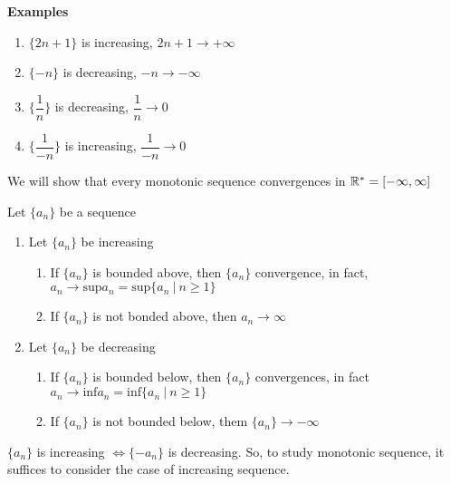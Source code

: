 \textbf{Examples}

\begin{enumerate}[wide,label = $\bullet$]
	\item $\{2n + 1\}$ is increasing, $2n+1 \rightarrow + \infty$
	\item $\{-n\}$ is decreasing, $-n \rightarrow - \infty$
	\item $\{\dfrac{1}{n}\}$ is decreasing, $\dfrac{1}{n} \rightarrow 0$
	\item $\{\dfrac{1}{-n}\}$ is increasing, $\dfrac{1}{-n} \rightarrow 0$
\end{enumerate}

We will show that every monotonic sequence convergences in $\mathbb{R}^* = [-\infty,\infty]$


\begin{thm}
	Let $\{a_n\}$ be a sequence	
	\begin{enumerate}[wide,label = ($\alph*$)]
			\item Let $\{a_n\}$ be increasing
			\begin{enumerate}[label = ($\roman*$)]
				\item If $\{a_n\}$ is bounded above, then $\{a_n\}$ convergence, in fact, $a_n \rightarrow \text{sup}a_n = \text{sup}\{a_n~|~ n \geq 1\}$
				\item If $\{a_n\}$ is not bonded above, then $a_n \rightarrow \infty$
			\end{enumerate}
			\item Let $\{a_n\}$ be decreasing
			\begin{enumerate}
				\item If $\{a_n\}$ is bounded below, then $\{a_n\}$ convergences, in fact $a_n \rightarrow \text{inf} a_n = \text{inf}\{a_n~|~ n \geq 1\}$
				\item If $\{a_n\}$ is not bounded below, them $\{a_n\} \rightarrow - \infty$
			\end{enumerate}
	\end{enumerate}

\end{thm}

\begin{rmk*}
	$\{a_n\}$ is increasing $\Leftrightarrow \{-a_n\}$ is decreasing. So, to study monotonic sequence, it suffices to consider the case of increasing sequence.	
\end{rmk*}

